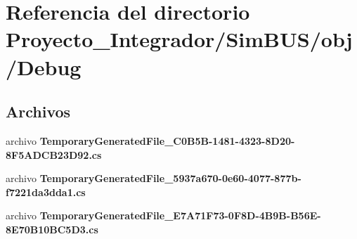 \section{Referencia del directorio Proyecto\-\_\-\-Integrador/\-Sim\-B\-U\-S/obj/\-Debug}
\label{dir_93b7d13f0f7cc6e32d708c9268498262}
\subsection*{Archivos}
\begin{DoxyCompactItemize}
\item 
archivo {\bf Temporary\-Generated\-File\-\_\-C0\-B5\-B-\/1481-\/4323-\/8\-D20-\/8\-F5\-A\-D\-C\-B23\-D92.\-cs}
\item 
archivo {\bf Temporary\-Generated\-File\-\_\-5937a670-\/0e60-\/4077-\/877b-\/f7221da3dda1.\-cs}
\item 
archivo {\bf Temporary\-Generated\-File\-\_\-\-E7\-A71\-F73-\/0\-F8\-D-\/4\-B9\-B-\/\-B56\-E-\/8\-E70\-B10\-B\-C5\-D3.\-cs}
\end{DoxyCompactItemize}
